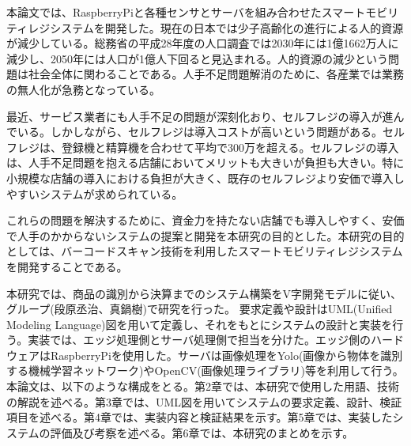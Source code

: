 本論文では、RaspberryPiと各種センサとサーバを組み合わせたスマートモビリティレジシステムを開発した。現在の日本では少子高齢化の進行による人的資源が減少している。総務省の平成28年度の人口調査では2030年には1億1662万人に減少し、2050年には人口が1億人下回ると見込まれる\cite{population}。人的資源の減少という問題は社会全体に関わることである。人手不足問題解消のために、各産業では業務の無人化が急務となっている。

最近、サービス業者にも人手不足の問題が深刻化おり、セルフレジの導入が進んでいる。しかしながら、セルフレジは導入コストが高いという問題がある。セルフレジは、登録機と精算機を合わせて平均で300万を超える\cite{self_register}。セルフレジの導入は、人手不足問題を抱える店舗においてメリットも大きいが負担も大きい。特に小規模な店舗の導入における負担が大きく、既存のセルフレジより安価で導入しやすいシステムが求められている。

これらの問題を解決するために、資金力を持たない店舗でも導入しやすく、安価で人手のかからないシステムの提案と開発を本研究の目的とした。本研究の目的としては、バーコードスキャン技術を利用したスマートモビリティレジシステムを開発することである。

本研究では、商品の識別から決算までのシステム構築をV字開発モデルに従い、グループ(段原丞治、真鍋樹)で研究を行った。
要求定義や設計はUML(Unified Modeling Language)図を用いて定義し、それをもとにシステムの設計と実装を行う。実装では、エッジ処理側とサーバ処理側で担当を分けた。エッジ側のハードウェアはRaspberryPiを使用した。サーバは画像処理をYolo(画像から物体を識別する機械学習ネットワーク)\cite{yolo}やOpenCV(画像処理ライブラリ)\cite{opencv}等を利用して行う。
本論文は、以下のような構成をとる。第2章では、本研究で使用した用語、技術の解説を述べる。第3章では、UML図を用いてシステムの要求定義、設計、検証項目を述べる。第4章では、実装内容と検証結果を示す。第5章では、実装したシステムの評価及び考察を述べる。第6章では、本研究のまとめを示す。